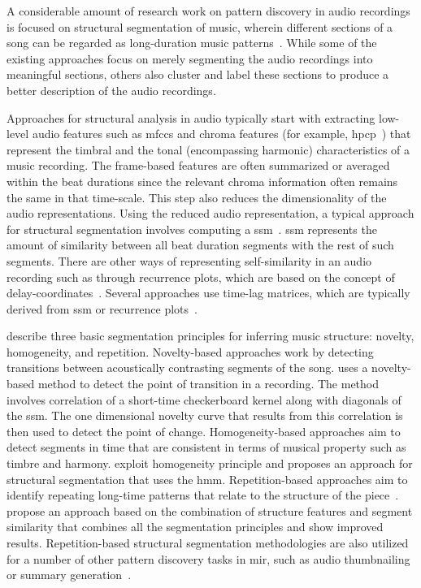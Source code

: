 A considerable amount of research work on pattern discovery in audio recordings is focused on structural segmentation of music, wherein different sections of a song can be regarded as long-duration music patterns~\citep{paulus2010state}. While some of the existing approaches focus on merely segmenting the audio recordings into meaningful sections, others also cluster and label these sections to produce a better description of the audio recordings. 

Approaches for structural analysis in audio typically start with extracting low-level audio features such as \glspl{mfcc} and chroma features (for example, \gls{hpcp}~\citep{gomez2006tonal}) that represent the timbral and the tonal (encompassing harmonic) characteristics of a music recording. The frame-based features are often summarized or averaged within the beat durations since the relevant chroma information often remains the same in that time-scale. This step also reduces the dimensionality of the audio representations. Using the reduced audio representation, a typical approach for structural segmentation involves computing a \gls{ssm}~\citep{foote2000automatic}. \Gls{ssm} represents the amount of similarity between all beat duration segments with the rest of such segments. There are other ways of representing self-similarity in an audio recording such as through recurrence plots, which are based on the concept of delay-coordinates~\citep{serra2014unsupervised}. Several approaches use time-lag matrices, which are typically derived from \gls{ssm} or recurrence plots~\citep{Goto06TASLP}.

\cite{paulus2010state} describe three basic segmentation principles for inferring music structure: novelty, homogeneity, and repetition. Novelty-based approaches work by detecting transitions between acoustically contrasting segments of the song. \cite{foote2000automatic} uses a novelty-based method to detect the point of transition in a recording. The method involves correlation of a short-time checkerboard kernel along with diagonals of the \gls{ssm}. The one dimensional novelty curve that results from this correlation is then used to detect the point of change. Homogeneity-based approaches aim to detect segments in time that are consistent in terms of musical property such as timbre and harmony. \cite{Levy08TASLP} exploit homogeneity principle and proposes an approach for structural segmentation that uses the \acrfull{hmm}. Repetition-based approaches aim to identify repeating long-time patterns that relate to the structure of the piece~\citep{Goto06TASLP,dannenberg2003pattern,muller2006towards}.  \cite{serra2014unsupervised} propose an approach based on the combination of structure features and segment similarity that combines all the segmentation principles and show improved results. Repetition-based structural segmentation methodologies are also utilized for a number of other pattern discovery tasks in \gls{mir}, such as audio thumbnailing or summary generation~\citep{chai2003music,aucouturier2002finding,muller2013robust,nieto2012compressing}. 

